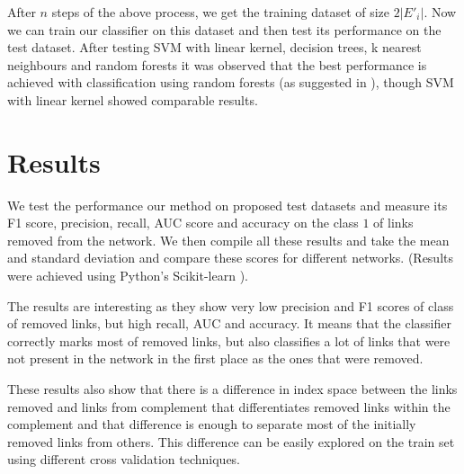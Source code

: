 \documentclass{llncs}
\begin{document}
After $n$ steps of the above process, we get the training dataset of size $2 |E'_i|$. Now we can train our classifier on this dataset and then test its performance on the test dataset. After testing SVM with linear kernel, decision trees, k nearest neighbours and random forests it was observed that the best performance is achieved with classification using random forests (as suggested in \cite{features-for-sl}), though SVM with linear kernel showed comparable results.
%
\section{Results}
%
We test the performance our method on proposed test datasets and measure its F1 score, precision, recall, AUC score and accuracy on the class $1$ of links removed from the network. We then compile all these results and take the mean and standard deviation and compare these scores for different networks. (Results were achieved using Python's Scikit-learn \cite{scikit}).

The results are interesting as they show very low precision and F1 scores of class of removed links, but high recall, AUC and accuracy. It means that the classifier correctly marks most of removed links, but also classifies a lot of links that were not present in the network in the first place as the ones that were removed.

These results also show that there is a difference in index space between the links removed and links from complement that differentiates removed links within the complement and that difference is enough to separate most of the initially removed links from others. This difference can be easily explored on the train set using different cross validation techniques.
\end{document}
